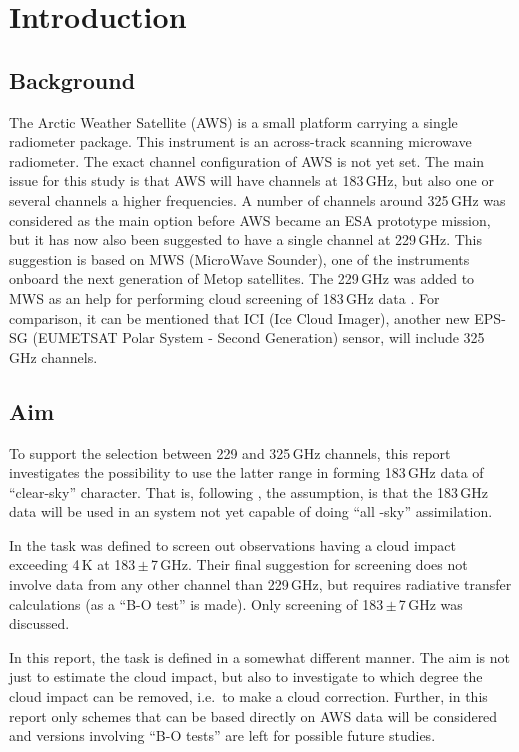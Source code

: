 \documentclass[12pt]{article}
\begin{document}
\section{Introduction}
%
\subsection{Background}
The Arctic Weather Satellite (AWS) is a small platform carrying a single
radiometer package. This instrument is an across-track scanning microwave
radiometer. The exact channel configuration of AWS is not yet set. The main
issue for this study is that AWS will have channels at 183\,GHz, but also one
or several channels a higher frequencies. A number of channels around 325\,GHz
was considered as the main option before AWS became an ESA prototype mission,
but it has now also been suggested to have a single channel at 229\,GHz. This
suggestion is based on MWS (MicroWave Sounder), one of the instruments onboard
the next generation of Metop satellites. The 229\,GHz was added to MWS as an
help for performing cloud screening of 183\,GHz data
\citep{rekha2012potential}. For comparison, it can be mentioned that ICI (Ice
Cloud Imager), another new EPS-SG (EUMETSAT Polar System - Second Generation) sensor, will include 325\,GHz channels.

\subsection{Aim}
%
To support the selection between 229 and 325\,GHz channels, this report
investigates the possibility to use the latter range in forming 183\,GHz data of
``clear-sky'' character. That is, following \citet{rekha2012potential}, the
assumption, is that the 183\,GHz data will be used in an system not yet
capable of doing ``all -sky'' assimilation.

In \citet{rekha2012potential} the task was defined to screen out observations
having a cloud impact exceeding 4\,K at 183\,$\pm$\,7\,GHz. Their final suggestion
for screening does not involve data from any other channel than 229\,GHz, but
requires radiative transfer calculations (as a ``B-O test'' is made). Only 
screening of 183\,$\pm$\,7\,GHz was discussed.

In this report, the task is defined in a somewhat different manner. The aim is
not just to estimate the cloud impact, but also to investigate to which degree
the cloud impact can be removed, i.e.\ to make a cloud correction. Further, in
this report only schemes that can be based directly on AWS data will be
considered and versions involving ``B-O tests'' are left for possible future
studies.
\end{document}
